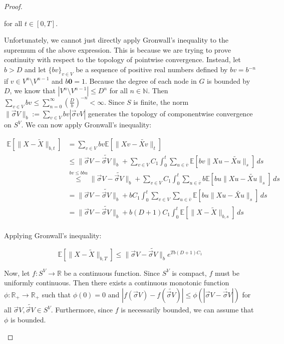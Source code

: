\documentclass[12pt]{article}
\newcommand{\mb}{\mathbb}
\newcommand{\ra}{\rightarrow}
\newcommand{\ov}{\overline}
\newcommand{\os}{\overset}
\newcommand{\ind}{\hspace{24pt}}
\newcommand{\ex}[1]{\mb{E}\left[#1\right]}			%
\renewcommand{\root}{\mathbf{0}}				%
\renewcommand{\v}{v}							%
\newcommand{\vv}{u}								%
\renewcommand{\S}{S}							%
\newcommand{\s}{\sigma}							%
\newcommand{\sv}{\vec{\s}}						%
\renewcommand{\b}{b}							%
\newcommand{\T}{T}								%
\renewcommand{\t}{t}							%
\renewcommand{\tt}{s}							%
\newcommand{\X}{X}								%
\newcommand{\cl}{\ov}							%
\newcommand{\degr}{D}								%
\newcommand{\pup}[1]{^{#1}}							%
\newcommand{\numb}{n}								%
\newcommand{\XState}[1]{\S^{#1}}				%
\newcommand{\const}[1]{C_{#1}}						%
\newcommand{\alt}{\widetilde}						%
\begin{document}
\begin{proof}
\begin{enumerate}[(a)]
for all \(\t \in [0,\T]\).

\ind Unfortunately, we cannot just directly apply Gronwall's inequality to the supremum of the above expression. This is because we are trying to prove continuity with respect to the topology of pointwise convergence. Instead, let \(\b{} > \degr\) and let \(\{\b{\v}\}_{\v \in  V}\) be a sequence of positive real numbers defined by \(\b{\v} = \b{}^{-\numb}\) if \(\v \in  V\pup{\numb}\setminus  V\pup{\numb-1}\) and \(\b{\root} = 1\). Because the degree of each node in \(G\) is bounded by \(\degr\), we know that \(| V\pup{\numb}\setminus  V\pup{\numb-1}| \leq \degr^{\numb}\) for all \(\numb\in \mb{N}\). Then \(\sum_{\v \in  V} \b{\v} \leq \sum_{\numb=0}^\infty \left(\frac{\degr}{\b{}}\right)^{-\numb} < \infty\). Since \(\S\) is finite, the norm \(\|\sv{}{ V}\|_{\b{}} := \sum_{\v \in  V} \b{\v}|\sv{\v}{ V}|\) generates the topology of componentwise convergence on \(\S^ V\). We can now apply Gronwall's inequality:

\begin{align*}
\ex{\|\X{}{} - \alt{\X{}{}}\|_{\b{},\t}} &= \sum_{\v \in  V} \b{\v}\ex{\|\X{\v}{} - \alt{\X{\v}{}}\|_\t}\\
&\leq \|\sv{}{ V} - \alt{\sv{}{ V}}\|_{\b{}} + \sum_{\v \in  V}\const{1}\int_0^\t \sum_{\vv \in \cl{\v}} \ex{\b{\v}\|\X{\vv}{} - \alt{\X{\vv}{}}\|_\tt}\,d\tt\\
&\os{\b{\v}\leq \b{}\b{\vv}}{\leq} \|\sv{}{ V} - \alt{\sv{}{ V}}\|_{\b{}} + \sum_{\v \in  V}\const{1}\int_0^\t \sum_{\vv \in \cl{\v}} \b{}\ex{\b{\vv}\|\X{\vv}{} - \alt{\X{\vv}{}}\|_\tt}\,d\tt\\
&= \|\sv{}{ V} - \alt{\sv{}{ V}}\|_{\b{}} + \b{}\const{1}\int_0^\t \sum_{\v \in  V}\sum_{\vv \in \cl{\v}} \ex{\b{\vv}\|\X{\vv}{} - \alt{\X{\vv}{}}\|_\tt}\,d\tt\\
&=\|\sv{}{ V} - \alt{\sv{}{ V}}\|_{\b{}} + \b{}(\degr+1)\const{1}\int_0^\t \ex{\|\X{}{} - \alt{\X{}{}}\|_{\b{},\tt}}\,d\tt\\
\end{align*}

Applying Gronwall's inequality:

\[\ex{\|\X{}{} - \alt{\X{}{}}\|_{\b{},\T}} \leq \|\sv{}{ V} - \alt{\sv{}{ V}}\|_{\b{}}e^{\T\b{}(\degr+1)\const{1}}\]

Now, let \(f: \S^ V \ra \mb{R}\) be a continuous function. Since \(\S^ V\) is compact, \(f\) must be uniformly continuous. Then there exists a continuous monotonic function \(\phi: \mb{R}_+ \ra \mb{R}_+\) such that \(\phi(0) = 0\) and \(|f(\sv{}{ V}) - f(\alt{\sv{}{ V}})| \leq \phi(|\sv{}{ V} - \alt{\sv{}{ V}}|)\) for all \(\sv{}{ V},\alt{\sv{}{ V}}\in \S^ V\). Furthermore, since \(f\) is necessarily bounded, we can assume that \(\phi\) is bounded.


\end{enumerate}
\end{proof}
\end{document}
